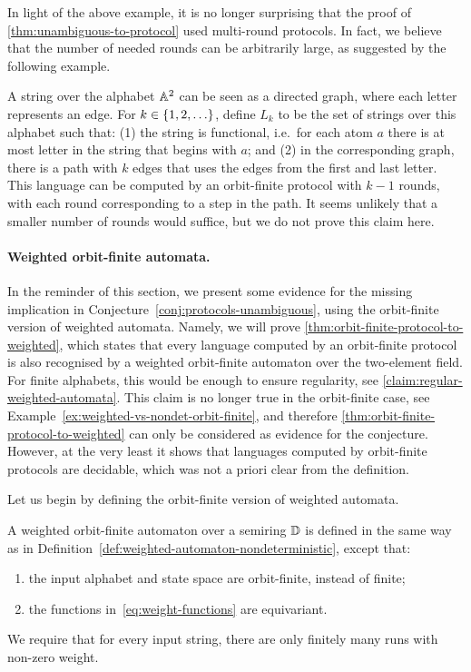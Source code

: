 In light of the above example, it is no longer surprising that the proof of
\cref{thm:unambiguous-to-protocol} used multi-round protocols. In fact, we
believe that the number of needed rounds can be arbitrarily large, as suggested
by the following example. 

\begin{myexample}
    A string over the alphabet $\mathbb A^2$ can be seen as a directed graph, where each letter represents an edge. For $k \in \{1,2,\ldots\}$, define  $L_k$ to be the set of strings over this alphabet such that: (1) the string is functional, i.e.~for each atom $a$ there is at most letter in the string that begins with $a$; and (2) in the corresponding graph, there is a path with $k$ edges that uses the edges from the first and last letter. This language can be computed by an orbit-finite protocol with $k-1$ rounds, with each round corresponding to a step in the path. It seems unlikely that a smaller number of rounds would suffice, but we do not prove this claim here. 
\end{myexample}



\paragraph*{Weighted orbit-finite automata.} In the reminder of this section, we present some evidence for the missing implication
in Conjecture~\ref{conj:protocols-unambiguous}, using the orbit-finite version of weighted automata. Namely, we will prove
\cref{thm:orbit-finite-protocol-to-weighted}, which states that every language computed by an orbit-finite protocol is also recognised by a weighted orbit-finite automaton over the two-element field.
For finite alphabets, this would be enough to ensure regularity, see \cref{claim:regular-weighted-automata}. This claim is no longer true in the orbit-finite case, see Example~\ref{ex:weighted-vs-nondet-orbit-finite}, and therefore \cref{thm:orbit-finite-protocol-to-weighted} can only be considered as evidence for the conjecture. However, at the very least it shows that languages computed by orbit-finite protocols are decidable, which was not a priori clear from the definition.

Let us begin by defining the orbit-finite version of weighted automata. 
\begin{definition}
    \label{def:weighted-orbit-finite-automata}
    A weighted orbit-finite automaton over a semiring $\mathbb D$ is defined in the same way as in Definition~\ref{def:weighted-automaton-nondeterministic}, except that:
    \begin{enumerate}
        \item the input alphabet and state space are orbit-finite, instead of finite;
        \item the functions in~\eqref{eq:weight-functions} are equivariant.
    \end{enumerate}
     We require that for every input string, there are only finitely many runs with non-zero weight.
\end{definition}

